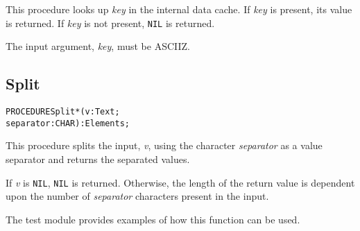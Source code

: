 This procedure looks up \emph{key} in the internal data cache.  If
\emph{key} is present, its value is returned.  If \emph{key} is not
present, \texttt{NIL} is returned.

The input argument, \emph{key}, must be ASCIIZ.


\subsection{Split}
\begin{alltt}
  PROCEDURE Split*(v         : Text;
                   separator : CHAR) : Elements;
\end{alltt}

This procedure splits the input, \emph{v}, using the character
\emph{separator} as a value separator and returns the separated
values.

If \emph{v} is \texttt{NIL}, \texttt{NIL} is returned.
Otherwise, the length of the return value is dependent upon the number
of \emph{separator} characters present in the input.

The test module provides examples of how this function can be used.


